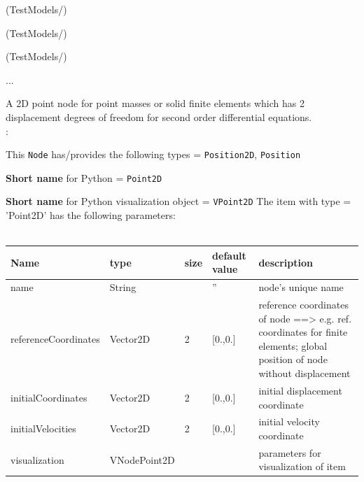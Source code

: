 \item {} (TestModels/)
\item {} (TestModels/)
\item {} (TestModels/)
\item  ...


\ei

%
\newpage


\label{sec:item:NodePoint2D}
A 2D point node for point masses or solid finite elements which has 2 displacement degrees of freedom for second order differential equations.
\vspace{12pt}\\

\noindent {}:
\bi
  \item This \texttt{Node} has/provides the following types = \texttt{Position2D}, \texttt{Position}
  \item {\bf Short name} for Python = \texttt{Point2D}
  \item {\bf Short name} for Python visualization object = \texttt{VPoint2D}
\ei\vspace{12pt} \noindent 
The item  with type = 'Point2D' has the following parameters:
\vspace{-0.5cm}\\
\vspace{-0.5cm}\\
\begin{center}
  \footnotesize
  \begin{longtable}{| p{4.5cm} | p{2.5cm} | p{0.5cm} | p{2.5cm} | p{6cm} |}
    \hline
    \bf Name & \bf type & \bf size & \bf default value & \bf description \\ \hline
    name &     String &      &     '' &     node's unique name\\ \hline
    referenceCoordinates &     Vector2D &     2 &     [0.,0.] &     reference coordinates of node ==> e.g. ref. coordinates for finite elements; global position of node without displacement\\ \hline
    initialCoordinates &     Vector2D &     2 &     [0.,0.] &     initial displacement coordinate\\ \hline
    initialVelocities &     Vector2D &     2 &     [0.,0.] &     initial velocity coordinate\\ \hline
    visualization &     VNodePoint2D &      &      &     parameters for visualization of item\\ \hline
\end{longtable}
\end{center}

